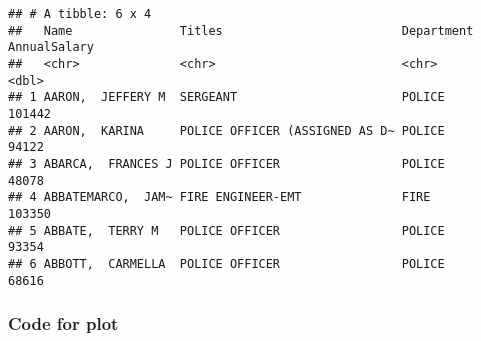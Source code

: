 \documentclass[]{book}
\newenvironment{Shaded}{\begin{snugshade}}{\end{snugshade}}
\newcommand{\KeywordTok}[1]{\textcolor[rgb]{0.13,0.29,0.53}{\textbf{#1}}}
\newcommand{\NormalTok}[1]{#1}
\newcommand{\OperatorTok}[1]{\textcolor[rgb]{0.81,0.36,0.00}{\textbf{#1}}}
\newcommand{\StringTok}[1]{\textcolor[rgb]{0.31,0.60,0.02}{#1}}
\begin{document}
\begin{Shaded}
\end{Shaded}

\begin{verbatim}
## # A tibble: 6 x 4
##   Name               Titles                         Department AnnualSalary
##   <chr>              <chr>                          <chr>             <dbl>
## 1 AARON,  JEFFERY M  SERGEANT                       POLICE           101442
## 2 AARON,  KARINA     POLICE OFFICER (ASSIGNED AS D~ POLICE            94122
## 3 ABARCA,  FRANCES J POLICE OFFICER                 POLICE            48078
## 4 ABBATEMARCO,  JAM~ FIRE ENGINEER-EMT              FIRE             103350
## 5 ABBATE,  TERRY M   POLICE OFFICER                 POLICE            93354
## 6 ABBOTT,  CARMELLA  POLICE OFFICER                 POLICE            68616
\end{verbatim}

\hypertarget{comphistscode}{%
\subsubsection*{Code for plot}\label{comphistscode}}
\end{document}
